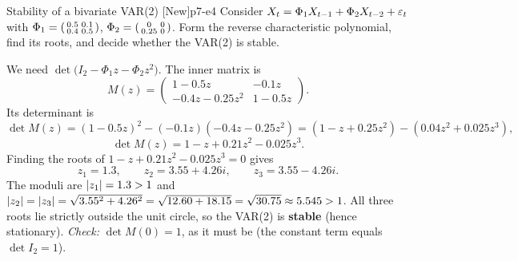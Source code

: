 \begin{exercise}{Stability of a bivariate VAR(2) \quad\textnormal{[New]}}{p7-e4}
Consider $X_t=\Phi_1 X_{t-1}+\Phi_2 X_{t-2}+\varepsilon_t$ with
$\Phi_1=\begin{psmallmatrix}0.5&0.1\\0.4&0.5\end{psmallmatrix}$,
$\Phi_2=\begin{psmallmatrix}0&0\\0.25&0\end{psmallmatrix}$. Form the reverse
characteristic polynomial, find its roots, and decide whether the VAR(2) is
stable.
\end{exercise}
\begin{solution}
We need $\det\!\big(I_2-\Phi_1 z-\Phi_2 z^2\big)$. The inner matrix is
\[
M(z)=\begin{pmatrix}1-0.5z & -0.1z\\ -0.4z-0.25z^2 & 1-0.5z\end{pmatrix}.
\]
Its determinant is
\[
\det M(z)=(1-0.5z)^2-(-0.1z)(-0.4z-0.25z^2)
=(1-z+0.25z^2)-(0.04z^2+0.025z^3),
\]
\[
\det M(z)=1-z+0.21z^2-0.025z^3 .
\]
Finding the roots of $1-z+0.21z^2-0.025z^3=0$ gives
\[
z_1=1.3,\qquad z_2=3.55+4.26i,\qquad z_3=3.55-4.26i .
\]
The moduli are $\left\lvert z_1 \right\rvert=1.3>1$ and
$\left\lvert z_2 \right\rvert=\left\lvert z_3 \right\rvert=\sqrt{3.55^2+4.26^2}=\sqrt{12.60+18.15}=\sqrt{30.75}\approx5.545>1$.
All three roots lie strictly outside the unit circle, so the VAR(2) is
\textbf{stable} (hence stationary). \emph{Check:} $\det M(0)=1$, as it must be
(the constant term equals $\det I_2=1$).
\end{solution}

